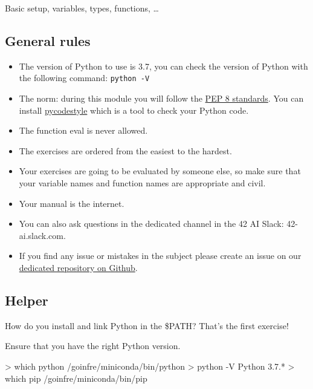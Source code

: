 \documentclass[]{article}
\newenvironment{Shaded}{\begin{snugshade}}{\end{snugshade}}
\newcommand{\NormalTok}[1]{\textcolor[rgb]{0.81,0.81,0.76}{#1}}
\begin{document}
Basic setup, variables, types, functions, \ldots{}

\hypertarget{general-rules}{%
\subsection{General rules}\label{general-rules}}

\begin{itemize}
\item
  The version of Python to use is 3.7, you can check the version of
  Python with the following command: \texttt{python\ -V}
\item
  The norm: during this module you will follow the
  \href{https://www.python.org/dev/peps/pep-0008/}{PEP 8 standards}. You
  can install \href{https://pypi.org/project/pycodestyle}{pycodestyle}
  which is a tool to check your Python code.
\item
  The function eval is never allowed.
\item
  The exercises are ordered from the easiest to the hardest.
\item
  Your exercises are going to be evaluated by someone else, so make sure
  that your variable names and function names are appropriate and civil.
\item
  Your manual is the internet.
\item
  You can also ask questions in the dedicated channel in the 42 AI
  Slack: 42-ai.slack.com.
\item
  If you find any issue or mistakes in the subject please create an
  issue on our
  \href{https://github.com/42-AI/bootcamp_python/issues}{dedicated
  repository on Github}.
\end{itemize}

\hypertarget{helper}{%
\subsection{Helper}\label{helper}}

How do you install and link Python in the \$PATH? That's the first
exercise!

Ensure that you have the right Python version.

\begin{Shaded}
\begin{Highlighting}[]
\NormalTok{> which python}
\NormalTok{/goinfre/miniconda/bin/python}
\NormalTok{> python -V}
\NormalTok{Python 3.7.*}
\NormalTok{> which pip}
\NormalTok{/goinfre/miniconda/bin/pip}
\end{Highlighting}
\end{Shaded}
\end{document}
